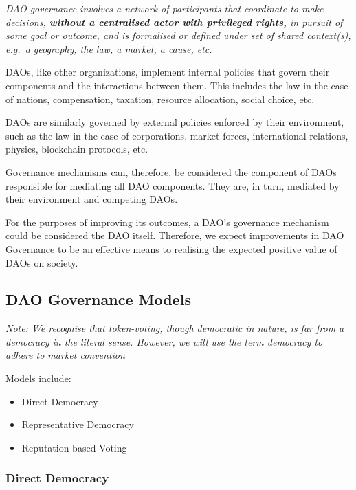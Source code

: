 \documentclass[
]{article}
\providecommand{\tightlist}{%
  \setlength{\itemsep}{0pt}\setlength{\parskip}{0pt}}
\begin{document}
\emph{DAO governance involves a network of participants that coordinate
to make decisions, \textbf{without a centralised actor with privileged
rights,} in pursuit of some goal or outcome, and is formalised or
defined under set of shared context(s), e.g.~a geography, the law, a
market, a cause, etc.}

DAOs, like other organizations, implement internal policies that govern
their components and the interactions between them. This includes the
law in the case of nations, compensation, taxation, resource allocation,
social choice, etc.

DAOs are similarly governed by external policies enforced by their
environment, such as the law in the case of corporations, market forces,
international relations, physics, blockchain protocols, etc.

Governance mechanisms can, therefore, be considered the component of
DAOs responsible for mediating all DAO components. They are, in turn,
mediated by their environment and competing DAOs.

For the purposes of improving its outcomes, a DAO's governance mechanism
could be considered the DAO itself. Therefore, we expect improvements in
DAO Governance to be an effective means to realising the expected
positive value of DAOs on society.

\hypertarget{dao-governance-models}{%
\subsection{DAO Governance Models}\label{dao-governance-models}}

\emph{Note: We recognise that token-voting, though democratic in nature,
is far from a democracy in the literal sense. However, we will use the
term democracy to adhere to market convention}

Models include:

\begin{itemize}
\tightlist
\item
  Direct Democracy
\item
  Representative Democracy
\item
  Reputation-based Voting
\end{itemize}

\hypertarget{direct-democracy}{%
\subsubsection{Direct Democracy}\label{direct-democracy}}
\end{document}
